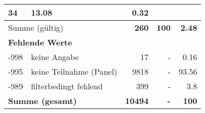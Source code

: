 \begin{longtable}{lXrrr}
       \num{34} &
       \num[round-mode=places,round-precision=2]{13.08} &
         \num[round-mode=places,round-precision=2]{0.32} \\
     \midrule
     \multicolumn{2}{l}{Summe (gültig)} &
       \textbf{\num{260}} &
     \textbf{\num{100}} &
       \textbf{\num[round-mode=places,round-precision=2]{2.48}} \\
     \multicolumn{5}{l}{\textbf{Fehlende Werte}}\\
       -998 &
       keine Angabe &
         \num{17} &
        - &
         \num[round-mode=places,round-precision=2]{0.16} \\
       -995 &
       keine Teilnahme (Panel) &
         \num{9818} &
        - &
         \num[round-mode=places,round-precision=2]{93.56} \\
       -989 &
       filterbedingt fehlend &
         \num{399} &
        - &
         \num[round-mode=places,round-precision=2]{3.8} \\
     \midrule
     \multicolumn{2}{l}{\textbf{Summe (gesamt)}} &
          \textbf{\num{10494}} &
        \textbf{-} &
        \textbf{\num{100}} \\
     \bottomrule
     \end{longtable}
     
